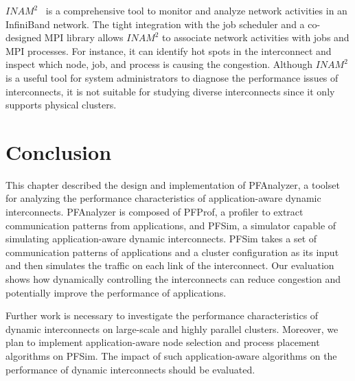 \(\mathit{INAM}^2\)~\autocite{Subramoni2016} is a comprehensive tool to
monitor and analyze network activities in an InfiniBand network. The
tight integration with the job scheduler and a co-designed MPI library
allows \(\mathit{INAM}^2\) to associate network activities with jobs and
MPI processes. For instance, it can identify hot spots in the
interconnect and inspect which node, job, and process is causing the
congestion. Although \(\mathit{INAM}^2\) is a useful tool for system
administrators to diagnose the performance issues of interconnects, it
is not suitable for studying diverse interconnects since it only
supports physical clusters.

\section{Conclusion}\label{sec:ii-conclusion}

This chapter described the design and implementation of PFAnalyzer, a
toolset for analyzing the performance characteristics of
application-aware dynamic interconnects. PFAnalyzer is composed of
PFProf, a profiler to extract communication patterns from applications,
and PFSim, a simulator capable of simulating application-aware dynamic
interconnects. PFSim takes a set of communication patterns of
applications and a cluster configuration as its input and then simulates
the traffic on each link of the interconnect. Our evaluation shows how
dynamically controlling the interconnects can reduce congestion and
potentially improve the performance of applications.

Further work is necessary to investigate the performance characteristics
of dynamic interconnects on large-scale and highly parallel clusters.
Moreover, we plan to implement application-aware node selection and
process placement algorithms on PFSim. The impact of such
application-aware algorithms on the performance of dynamic interconnects
should be evaluated.
